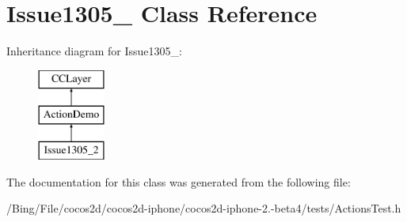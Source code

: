 \hypertarget{interface_issue1305__2}{\section{Issue1305\-\_ Class Reference}
\label{interface_issue1305__2}
}
Inheritance diagram for Issue1305\-\_\-:\begin{figure}[H]
\begin{center}
\leavevmode
\includegraphics[height=3.000000cm]{interface_issue1305__2}
\end{center}
\end{figure}


The documentation for this class was generated from the following file\-:\begin{DoxyCompactItemize}
\item 
/\-Bing/\-File/cocos2d/cocos2d-\/iphone/cocos2d-\/iphone-\/2.-\/beta4/tests/Actions\-Test.\-h\end{DoxyCompactItemize}
